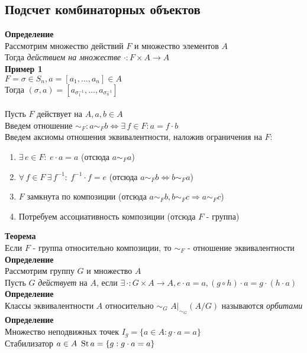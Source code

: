 \documentclass[12pt]{article}
\begin{document}
\subsection{Подсчет комбинаторных объектов}
\textbf{Определение}\\
Рассмотрим множество действий $F$ и множество элементов $A$\\
Тогда \textit{действием на множестве} $\cdot: F \times A \rightarrow A$\\
\textbf{Пример 1}\\
$F = \sigma \in S_n, a = [a_1, \ldots, a_n] \in A$\\
Тогда $(\sigma, a) = [a_{\sigma^{-1}_1}, \ldots, a_{\sigma^{-1}_n}]$\\\\
Пусть $F$ действует на $A, a,b \in A$\\
Введем отношение $\sim_F: a \sim_F b \Leftrightarrow \exists\,f \in F: a = f\cdot b$\\
Введем аксиомы отношения эквивалентности, наложив ограничения на $F$:
\begin{enumerate}
    \item $\exists\,e\in F:\ e\cdot a = a$ (отсюда $a \sim_F a$)
    \item $\forall\,f \in F\ \exists\,f^{-1}:\ f^{-1}\cdot f = e$ (отсюда $a \sim_F b \Leftrightarrow b \sim_F a$)
    \item $F$ замкнута по композиции (отсюда $a \sim_F b, b \sim_F c \Rightarrow a \sim_F c$)
    \item Потребуем ассоциативность композиции (отсюда $F$ - группа)
\end{enumerate}
\textbf{Теорема}\\
Если $F$ - группа относительно композиции, то $\sim_F$ - отношение эквивалентности\\
\textbf{Определение}\\
Рассмотрим группу $G$ и множество $A$\\
Пусть $G$ \textit{действует} на $A$, если $\exists\,\cdot: G\times A \rightarrow A, e\cdot a = a, (g\circ h)\cdot a = g\cdot(h\cdot a)$\\
\textbf{Определение}\\
Классы эквивалентности $A$ относительно $\sim_G$ $A|_{\sim_G}(A/G)$ называются \textit{орбитами}\\
\textbf{Определение}\\
Множество неподвижных точек $I_g = \{a \in A: g\cdot a = a\}$\\
Стабилизатор $a\in A\ \operatorname{St} a = \{g: g\cdot a = a\}$\\
\end{document}
